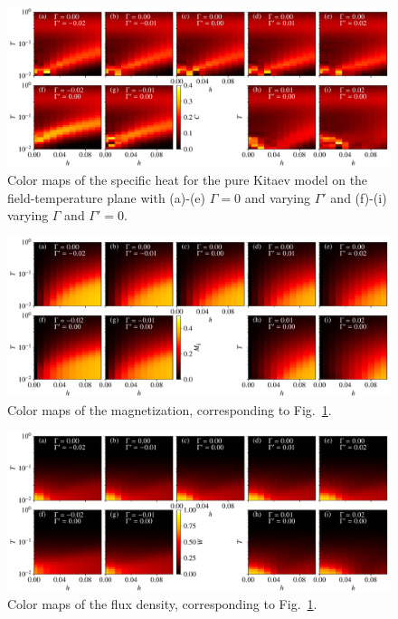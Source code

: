 \documentclass[twocolumn,superscriptaddress,showpacs, longbibliography, aps, prx]{revtex4-2}
\begin{document}
\begin{figure}[htb]
  \begin{center}
    \includegraphics[width=\linewidth]{Data_for_figs/plot/fig-16-2-XTRG-cmap-C.pdf}
  \end{center}
  \caption{
Color maps of the specific heat for the pure Kitaev model on the field-temperature plane with (a)-(e) $\Gamma=0$ and varying $\Gamma'$ and  (f)-(i) varying $\Gamma$ and $\Gamma'=0$.}
  \label{fig:color_map_C}
\end{figure}

\begin{figure}[htb]
  \begin{center}
    \includegraphics[width=\linewidth]{Data_for_figs/plot/fig-16-2-XTRG-cmap-mag.pdf}
  \end{center}
  \caption{
Color maps of the magnetization, corresponding to Fig.~\ref{fig:color_map_C}.} 
  \label{fig:color_map_mag}
\end{figure}

\begin{figure}[htb]
  \begin{center}
    \includegraphics[width=\linewidth]{Data_for_figs/plot/fig-16-2-XTRG-cmap-flux.pdf}
  \end{center}
  \caption{
Color maps of the flux density, corresponding to Fig.~\ref{fig:color_map_C}.} 
  \label{fig:color_map_flux}
\end{figure}
\end{document}
